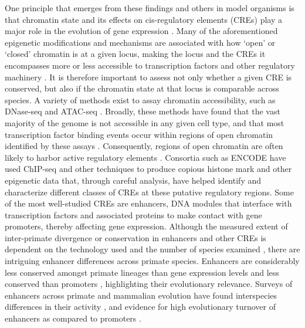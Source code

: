 One principle that emerges from these findings and others in model organisms is that chromatin state and its effects on cis-regulatory elements (CREs) play a major role in the evolution of gene expression \cite{Romero.2012, Degner.2012}. Many of the aforementioned epigenetic modifications and mechanisms are associated with how `open' or `closed' chromatin is at a given locus, making the locus and the CREs it encompasses more or less accessible to transcription factors and other regulatory machinery \cite{Calo.2013}. It is therefore important to assess not only whether a given CRE is conserved, but also if the chromatin state at that locus is comparable across species. A variety of methods exist to assay chromatin accessibility, such as DNase-seq and ATAC-seq \cite{Klein.2020, Tsompana.2014, Buenrostro.2015}. Broadly, these methods have found that the vast majority of the genome is not accessible in any given cell type, and that most transcription factor binding events occur within regions of open chromatin identified by these assays \cite{Thurman.2012}. Consequently, regions of open chromatin are often likely to harbor active regulatory elements \cite{Song.2011, Klemm.2019}. Consortia such as ENCODE have used ChIP-seq and other techniques to produce copious histone mark and other epigenetic data that, through careful analysis, have helped identify and characterize different classes of CREs at these putative regulatory regions\cite{consortium.2012a, Li.2018, Ernst.2012, Hoffman.2012}. Some of the most well-studied CREs are enhancers, DNA modules that interface with transcription factors and associated proteins to make contact with gene promoters, thereby affecting gene expression. Although the measured extent of inter-primate divergence or conservation in enhancers and other CREs is dependent on the technology used and the number of species examined \cite{Edsall.2019, Swain-Lenz.2019}, there are intriguing enhancer differences across primate species. Enhancers are considerably less conserved amongst primate lineages than gene expression levels \cite{Villar.2015, Berthelot.2018} and less conserved than promoters \cite{Trizzino.2017}, highlighting their evolutionary relevance. Surveys of enhancers across primate and mammalian evolution have found interspecies differences in their activity \cite{Klein.2018, Prescott.2015, Shibata.2012}, and evidence for high evolutionary turnover of enhancers as compared to promoters \cite{Carelli.2018, Villar.2015}.


